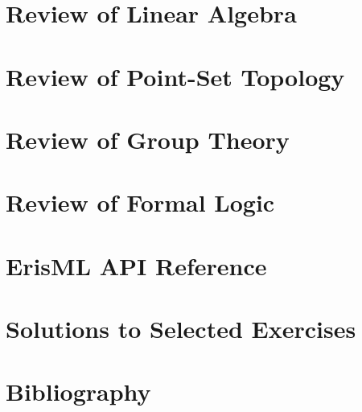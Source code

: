 \documentclass[12pt,letterpaper,twoside,openright]{book}
\theoremstyle{plain}
\theoremstyle{definition}
\theoremstyle{remark}
\newcounter{exercise}[chapter]
\begin{document}
\chapter{Review of Linear Algebra}

\chapter{Review of Point-Set Topology}

\chapter{Review of Group Theory}

\chapter{Review of Formal Logic}

\chapter{ErisML API Reference}

\chapter{Solutions to Selected Exercises}

\chapter{Bibliography}
\end{document}
